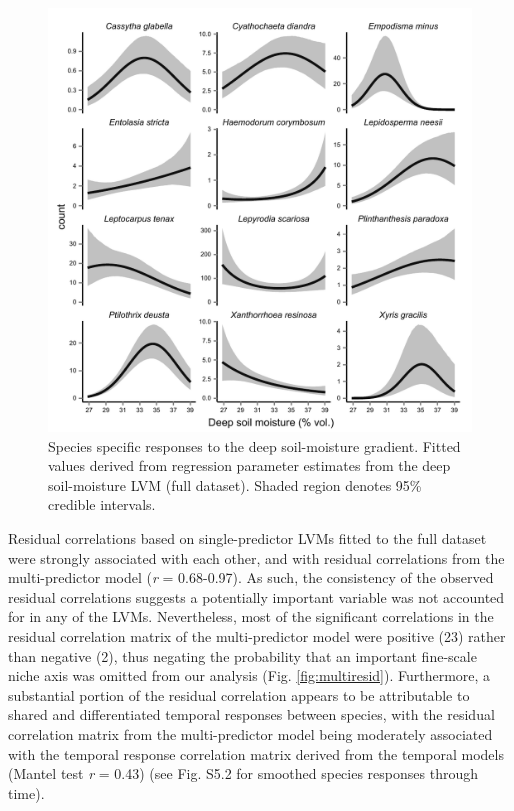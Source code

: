  \begin{figure}[H]
 \centering
 \includegraphics[width=1.0\linewidth]{Chapter5/Figures/responsefig_cred_mcmc}
 \caption{Species specific responses to the deep soil-moisture gradient. Fitted values derived from regression parameter estimates from the deep soil-moisture LVM (full dataset). Shaded region denotes 95\% credible intervals.}
 \label{fig:responsefig_cred}
 \end{figure}



Residual correlations based on single-predictor LVMs fitted to the full dataset were strongly associated with each other, and with residual correlations from the multi-predictor model (\textit{r} = 0.68-0.97). As such, the consistency of the observed residual correlations suggests a potentially important variable was not accounted for in any of the LVMs. Nevertheless, most of the significant correlations in the residual correlation matrix  of the multi-predictor model were positive (23) rather than negative (2), thus negating the probability that an important fine-scale niche axis was omitted from our analysis (Fig. \ref{fig:multiresid}). Furthermore, a substantial portion of the residual correlation appears to be attributable to shared and differentiated temporal responses between species, with the residual correlation matrix from the multi-predictor model being moderately associated with the temporal response correlation matrix derived from the temporal models (Mantel test \textit{r} = 0.43) (see Fig. S5.2 for smoothed species responses through time).



